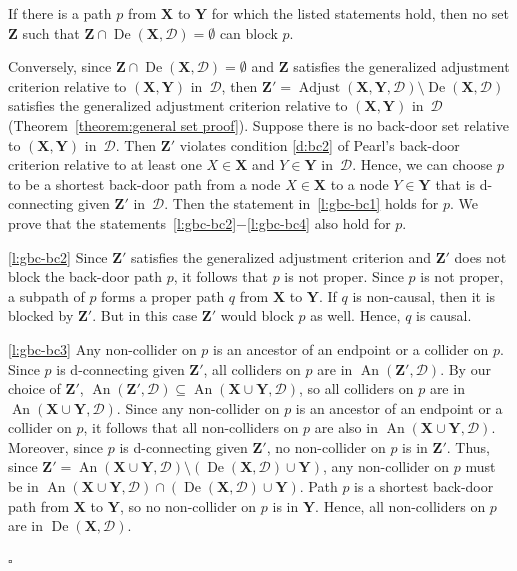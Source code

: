 \documentclass[11pt,a4paper]{article}
\newenvironment{proofof}[1][]{\begin{trivlist}
   \item[\hskip \labelsep {\bfseries Proof of #1.}]}{\hfill{}$\square$\end{trivlist}}
\DeclareMathOperator{\De}{De}
\DeclareMathOperator{\An}{An}
\DeclareMathOperator{\Adjust}{Adjust}
\newcommand{\g}[1][G]{\mathcal{#1}}
\newcommand{\adjustb}[2][X,Y]{\Adjust(\mathbf{#1},#2)}
\begin{document}
\begin{proofof}[Lemma~\ref{lemma:gbc bc}]
If there is a path $p$ from $\mathbf{X}$ to $\mathbf{Y}$ for which the listed statements hold, then no set $\mathbf{Z}$ such that $\mathbf{Z} \cap \De(\mathbf{X},\g[D])  = \emptyset$ can block $p$.

Conversely, since $\mathbf{Z} \cap \De(\mathbf{X},\g[D])  = \emptyset$ and $\mathbf{Z}$ satisfies the generalized adjustment criterion relative to $(\mathbf{X,Y})$ in~$\g[D]$, then $\mathbf{Z'} = \adjustb{\g[D]} \setminus \De(\mathbf{X}, \g[D])$ satisfies the generalized adjustment criterion relative to $(\mathbf{X,Y})$ in~$\g[D]$ (Theorem~\ref{theorem:general set proof}).
Suppose there is no back-door set relative to $(\mathbf{X,Y})$ in~$\g[D]$. 
Then $\mathbf{Z'}$ violates condition \ref{d:bc2} of Pearl's back-door criterion relative to at least one $X \in \mathbf{X}$ and $Y \in \mathbf{Y}$ in~$\g[D]$.
Hence, we can choose $p$ to be a shortest back-door path from a node $X \in \mathbf{X}$ to a node $Y \in \mathbf{Y}$ that is d-connecting given $\mathbf{Z'}$ in~$\g[D]$. Then the statement in~\ref{l:gbc-bc1} holds for $p$.
We prove that the statements~\ref{l:gbc-bc2}$-$\ref{l:gbc-bc4} also hold for $p$.

\ref{l:gbc-bc2} Since $\mathbf{Z'}$ satisfies the generalized adjustment criterion and $\mathbf{Z'}$ does not block the back-door path $p$, it follows that $p$ is not proper. Since $p$ is not proper, a subpath of $p$ forms a proper path $q$ from $\mathbf{X}$ to $\mathbf{Y}$. If $q$ is non-causal, then it is blocked by $\mathbf{Z'}$. But in this case $\mathbf{Z'}$ would block $p$ as well. Hence, $q$ is causal.

\ref{l:gbc-bc3} Any non-collider on $p$ is an ancestor of an endpoint or a collider on $p$. Since $p$ is d-connecting given $\mathbf{Z'}$, all colliders on $p$ are in $\An(\mathbf{Z'},\g[D])$. By our choice of $\mathbf{Z'}$, $\An(\mathbf{Z'},\g[D]) \subseteq \An(\mathbf{X} \cup \mathbf{Y}, \g[D])$, so all colliders on $p$ are in $\An(\mathbf{X} \cup \mathbf{Y}, \g[D])$. Since any non-collider on $p$ is an ancestor of an endpoint or a collider on $p$, it follows that all non-colliders on $p$ are also in $\An(\mathbf{X} \cup \mathbf{Y}, \g[D])$. Moreover, since $p$ is d-connecting given $\mathbf{Z'}$, no non-collider on $p$ is in $\mathbf{Z'}$. Thus, since $\mathbf{Z'} = \An(\mathbf{X} \cup \mathbf{Y}, \g[D]) \setminus (\De(\mathbf{X},\g[D]) \cup \mathbf{Y})$, any non-collider on $p$ must be in $\An(\mathbf{X} \cup \mathbf{Y},\g[D]) \cap (\De(\mathbf{X},\g[D]) \cup \mathbf{Y})$. Path $p$ is a shortest back-door path from $\mathbf{X}$ to $\mathbf{Y}$, so no non-collider on $p$ is in $\mathbf{Y}$. Hence, all non-colliders on $p$ are in $\De(\mathbf{X},\g[D])$.


\end{proofof}
\end{document}
